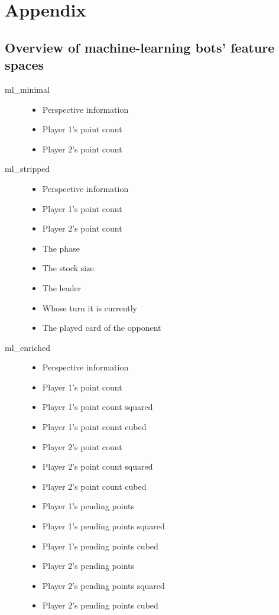 \documentclass[a4paper,11pt]{article}
\begin{document}
\clearpage
\section{Appendix}
\subsection{Overview of machine-learning bots' feature spaces}
\begin{description}
\item[ml\_minimal] \hfill
\begin{itemize}
\item Perspective information
\item Player 1's point count
\item Player 2's point count
\end{itemize}
\item[ml\_stripped] \hfill
\begin{itemize}
\item Perspective information
\item Player 1's point count
\item Player 2's point count
\item The phase
\item The stock size
\item The leader
\item Whose turn it is currently
\item The played card of the opponent
\end{itemize}
\item[ml\_enriched] \hfill
\begin{itemize}
\item Perspective information
\item Player 1's point count
\item Player 1's point count squared
\item Player 1's point count cubed
\item Player 2's point count
\item Player 2's point count squared
\item Player 2's point count cubed
\item Player 1's pending points
\item Player 1's pending points squared
\item Player 1's pending points cubed
\item Player 2's pending points
\item Player 2's pending points squared
\item Player 2's pending points cubed

\end{itemize}
\end{description}
\end{document}
